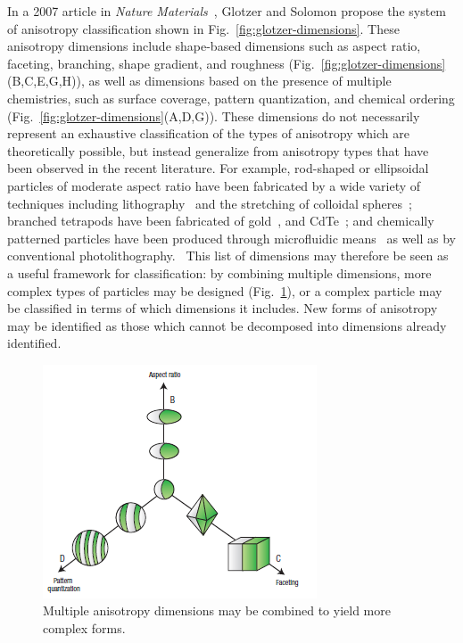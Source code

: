In a 2007 article in \textit{Nature Materials}~\cite{glotzer-solomon}, Glotzer and Solomon propose the system of anisotropy 
classification shown in Fig.~\ref{fig:glotzer-dimensions}. These 
anisotropy dimensions include shape-based dimensions such as aspect 
ratio, faceting, branching, shape gradient, 
and roughness (Fig.~\ref{fig:glotzer-dimensions}(B,C,E,G,H)), as well as dimensions based on the presence of
multiple chemistries, such as surface coverage, pattern quantization, and chemical ordering 
(Fig.~\ref{fig:glotzer-dimensions}(A,D,G)).  These dimensions do not necessarily 
represent an exhaustive classification of the types
of anisotropy which are theoretically possible, but 
instead generalize from anisotropy types that have been observed in the
recent literature.  For example, rod-shaped or ellipsoidal particles of moderate aspect ratio have been fabricated 
by a wide variety of techniques including 
lithography~\cite{desimone-shear} and the stretching of colloidal spheres~\cite{rods-mohraz}; branched 
tetrapods have been fabricated of gold~\cite{gold-tetrapods},
and CdTe~\cite{cdte-tetrapods}; and chemically patterned particles have been produced
through microfluidic means~\cite{shepherd-janus}
as well as by conventional photolithography.~\cite{desimone-janus}  This list of dimensions may therefore
be seen as a useful framework for classification: by combining multiple dimensions, more complex types of particles may be 
designed (Fig.~\ref{fig:dimensions-combined}), or a complex particle may be classified in terms of which dimensions it includes.
New forms of anisotropy may be identified as those which cannot be decomposed into dimensions already identified.

\begin{figure}[h]
\begin{center}
\includegraphics{figures/glotzer-combine-dimensions.png}
\end{center}
\caption{Multiple anisotropy dimensions may be combined to yield more complex forms.~\cite{glotzer-solomon}}
\label{fig:dimensions-combined}
\end{figure}

